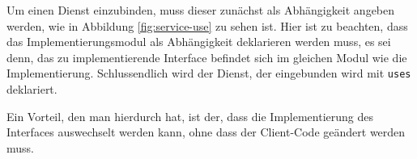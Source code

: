 Um einen Dienst einzubinden, muss  dieser zunächst als Abhängigkeit angeben werden, wie in Abbildung \ref{fig:service-use} zu sehen ist.
Hier ist zu beachten, dass das Implementierungsmodul als Abhängigkeit deklarieren werden muss, es sei denn, das zu implementierende Interface befindet sich im gleichen Modul wie die Implementierung.
Schlussendlich wird der Dienst, der eingebunden wird mit \texttt{uses} deklariert.

Ein Vorteil, den man hierdurch hat, ist der, dass die Implementierung des Interfaces auswechselt werden kann, ohne dass der Client-Code geändert werden muss.

